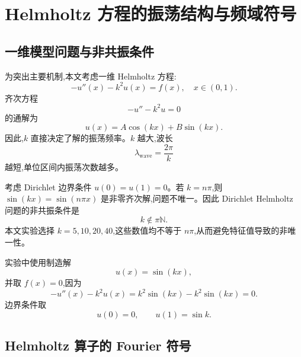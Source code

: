 \documentclass[12pt,hyperref,a4paper,UTF8,twoside]{ctexart}
\begin{document}
\section{Helmholtz 方程的振荡结构与频域符号}

\subsection{一维模型问题与非共振条件}

为突出主要机制,本文考虑一维 Helmholtz 方程:
\begin{equation}\label{eq:helmholtz-1d}
    -u''(x)-k^2u(x)=f(x),\quad x\in(0,1).
\end{equation}
齐次方程
\begin{equation}\label{eq:homogeneous-eq}
    -u''-k^2u=0
\end{equation}
的通解为
\begin{equation}\label{eq:homogeneous-solution}
    u(x)=A\cos(kx)+B\sin(kx).
\end{equation}
因此,$k$ 直接决定了解的振荡频率。$k$ 越大,波长
\begin{equation}\label{eq:wavelength}
    \lambda_{\mathrm{wave}}=\frac{2\pi}{k}
\end{equation}
越短,单位区间内振荡次数越多。

考虑 Dirichlet 边界条件 $u(0)=u(1)=0$。若 $k=n\pi$,则 $\sin(kx)=\sin(n\pi x)$ 是非零齐次解,问题不唯一。因此 Dirichlet Helmholtz 问题的非共振条件是
\begin{equation}\label{eq:nonresonance}
    k\notin \pi\mathbb N.
\end{equation}
本文实验选择 $k=5,10,20,40$,这些数值均不等于 $n\pi$,从而避免特征值导致的非唯一性。

实验中使用制造解
\begin{equation}\label{eq:manufactured-solution}
    u(x)=\sin(kx),
\end{equation}
并取 $f(x)=0$,因为
\begin{equation}\label{eq:manufactured-check}
    -u''(x)-k^2u(x)=k^2\sin(kx)-k^2\sin(kx)=0.
\end{equation}
边界条件取
\begin{equation}\label{eq:dirichlet-bc}
    u(0)=0,
    \qquad
    u(1)=\sin k.
\end{equation}

\subsection{Helmholtz 算子的 Fourier 符号}
\end{document}
